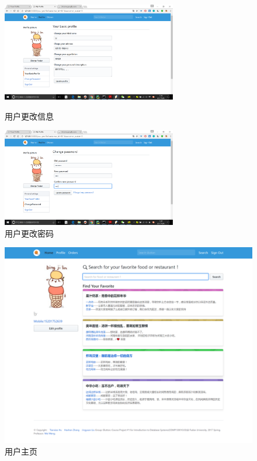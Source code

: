 \documentclass[12pt, oneside,a4paper]{article}
\begin{document}
\begin{itemize}
  \begin{figure}[H]
   \begin{minipage}[t]{0.5\linewidth}
    \centering
     \includegraphics[width=3in]{cu-profile.jpg}
     \caption{\small{用户更改信息}}
   \end{minipage}
   \begin{minipage}[t]{0.5\linewidth}
    \centering
     \includegraphics[width=3in]{cu-password.jpg}
      \caption{\small{用户更改密码}}
   \end{minipage}
   \end{figure}
   
  \begin{figure}[H]
   \centering
     \includegraphics[width=6.00in]{cu-home.png}
     \caption{\small{用户主页}}
  \end{figure}



\end{itemize}
\end{document}
